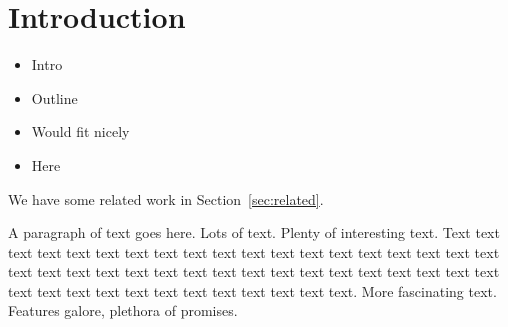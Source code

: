 \section{Introduction}
\label{sec:intro}

\begin{itemize}
  \item Intro
  \item Outline
  \item Would fit nicely
  \item Here
\end{itemize}

We have some related work in Section~\ref{sec:related}.


A paragraph of text goes here. Lots of text. Plenty of interesting
text. Text text text text text text text text text text text text text
text text text text text text text text text text text text text text
text text text text text text text text text text text text text text
text text text text text text text.
More fascinating text. Features galore, plethora of promises.